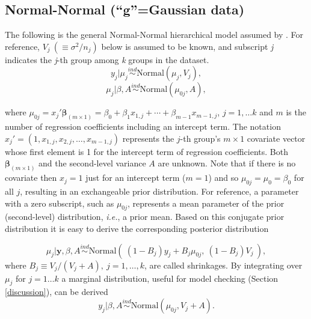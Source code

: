 \documentclass[article]{jss}
\begin{document}
\subsection[Normal-Normal]{Normal-Normal (``g''=Gaussian data)}
The following is the general Normal-Normal hierarchical model assumed by . For reference,  $V_{j}~(\equiv \sigma^{2}/n_{j})$ below is assumed to be known, and subscript \emph{j} indicates the \emph{j}-th group among \emph{k} groups in the dataset.
\begin{equation}\label{normalobs}
y_{j}\vert \mu_{j} \stackrel{ind}{\sim}\textrm{Normal}(\mu_{j}, V_{j}),
\end{equation}
\begin{equation}\label{normalprior}
\mu_{j}\vert \beta, A\stackrel{ind}{\sim}\textrm{Normal}(\mu_{0j}, A),
\end{equation}

where $\mu_{0j} = x_{j}' \mathbf{\beta}_{(m\times1)}=\beta_{0}+\beta_{1}x_{1, j} + \cdots + \beta_{m-1}x_{m-1, j}$, $j=1, \ldots k$ and $m$ is the number of regression coefficients including an intercept term. The notation $x_{j}'=(1, x_{1, j}, x_{2, j}, \ldots, x_{m-1, j})$ represents the $j$-th group's $m\times 1$ covariate vector whose first element is 1 for the intercept term of regression coefficients. Both $\mathbf{\beta}_{(m\times1)}$ and the second-level variance $A$ are unknown. Note that if there is no covariate then $x_{j}=1$ just for an intercept term ($m=1$) and so $\mu_{0j}=\mu_{0}=\beta_{0}$ for all $j$, resulting in an exchangeable prior distribution. For reference, a parameter with a zero subscript, such as $\mu_{0j}$, represents a mean parameter of the prior (second-level) distribution, \emph{i.e.}, a prior mean. Based on this conjugate prior distribution it is easy to derive the corresponding posterior distribution



\begin{equation} \label{normalpost}
\mu_{j}\vert \textbf{y}, \beta, A \stackrel{ind}{\sim}\textrm{Normal}(~(1-B_{j})y_{j} + B_{j}\mu_{0j},~(1-B_{j})V_{j}~),
\end{equation}
where $B_{j}\equiv V_{j}/(V_{j} + A),~j=1, \ldots, k$, are called shrinkages. By integrating over $\mu_{j}$ for $j = 1 \ldots k$ a marginal distribution, useful for model checking (Section \ref{discussion}), can be derived
\begin{equation} \label{normalmarginal}
y_{j}\vert \beta, A \stackrel{ind}{\sim}\textrm{Normal}(\mu_{0j}, V_{j} + A). 
\end{equation}
\end{document}
